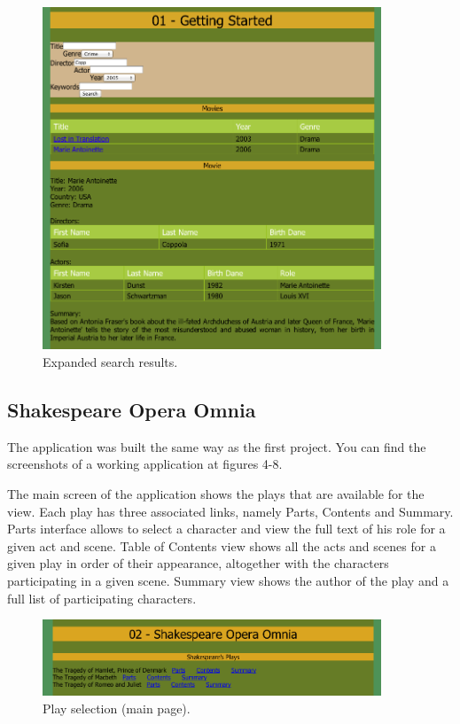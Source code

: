 \documentclass[a4paper, notitlepage]{article}
\begin{document}
\begin{figure}[ht]
\begin{center}
\includegraphics[width=0.9\textwidth]{01-3.png}
\caption{Expanded search results.}
\label{fig:01-3}
\end{center}
\end{figure}

\subsection{Shakespeare Opera Omnia}

The application was built the same way as the first project. You can find the screenshots of a working application at figures 4-8.

The main screen of the application shows the plays that are available for the view. Each play has three associated links, namely Parts, Contents and Summary. Parts interface allows to select a character and view the full text of his role for a given act and scene. Table of Contents view shows all the acts and scenes for a given play in order of their appearance, altogether with the characters participating in a given scene. Summary view shows the author of the play and a full list of participating characters.

\begin{figure}[ht]
\begin{center}
\includegraphics[width=0.9\textwidth]{02-1.png}
\caption{Play selection (main page).}
\label{fig:01-3}
\end{center}
\end{figure}
\end{document}
